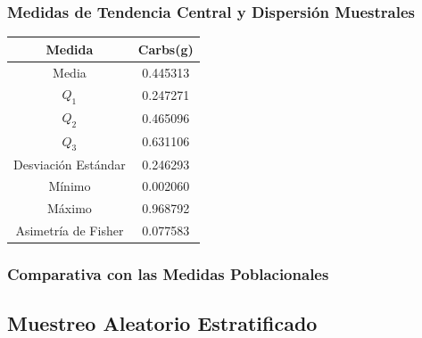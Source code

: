 \documentclass[12pt,a4paper]{article}
\begin{document}
    \subsubsection{Medidas de Tendencia Central y Dispersión Muestrales}
        \begin{center}
            \begin{tabular}{|c|c|}
                \hline
                Medida & Carbs(g) \\
                \hline
                Media & 0.445313 \\
                $Q_1$ & 0.247271 \\
                $Q_2$ & 0.465096 \\
                $Q_3$ & 0.631106 \\
                Desviación Estándar & 0.246293 \\
                Mínimo & 0.002060 \\
                Máximo & 0.968792 \\
                Asimetría de Fisher & 0.077583 \\
                \hline
                \end{tabular}
        \end{center}
    
    \subsubsection{Comparativa con las Medidas Poblacionales}
        
    
    \subsection{Muestreo Aleatorio Estratificado}
\end{document}
